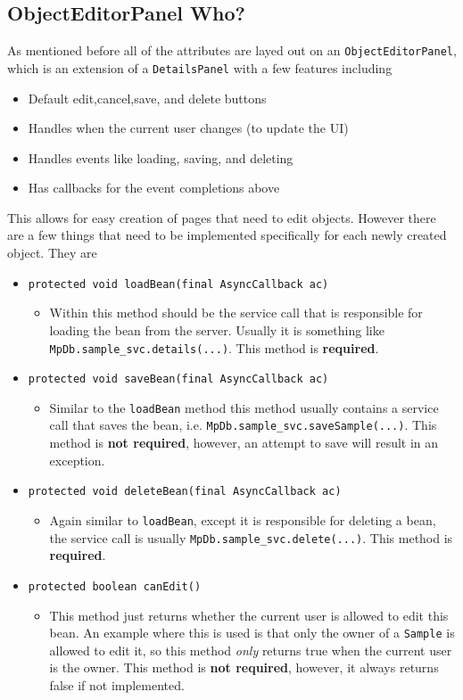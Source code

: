 \documentclass[10pt,letterpaper,onecolumn,oneside]{report}
\begin{document}
\subsection{ObjectEditorPanel Who?}
As mentioned before all of the attributes are layed out on an \texttt{ObjectEditorPanel},
which is an extension of a \texttt{DetailsPanel} with a few features including
\begin{itemize}
\item Default edit,cancel,save, and delete buttons
\item Handles when the current user changes (to update the UI)
\item Handles events like loading, saving, and deleting
\item Has callbacks for the event completions above
\end{itemize}
This allows for easy creation of pages that need to edit objects.  However there are a few
things that need to be implemented specifically for each newly created object.  They are
\begin{itemize}
\item \texttt{protected void loadBean(final AsyncCallback ac)}
\begin{itemize}
\item Within this method should be the service call that is responsible for
loading the bean from the server.  Usually it is something like
\texttt{MpDb.sample\_svc.details(...)}.  This method is \textbf{required}.
\end{itemize}
\item \texttt{protected void saveBean(final AsyncCallback ac)}
\begin{itemize}
\item Similar to the \texttt{loadBean} method this method usually contains a service call
that saves the bean, i.e. \texttt{MpDb.sample\_svc.saveSample(...)}.  This method is 
\textbf{not required}, however, an attempt to save will result in an exception.
\end{itemize}
\item \texttt{protected void deleteBean(final AsyncCallback ac)}
\begin{itemize}
\item Again similar to \texttt{loadBean}, except it is responsible for deleting a bean, the
service call is usually \texttt{MpDb.sample\_svc.delete(...)}.  This method is \textbf{required}.
\end{itemize}
\item \texttt{protected boolean canEdit()}
\begin{itemize}
\item This method just returns whether the current user is allowed to edit this bean.
An example where this is used is that only the owner of a \texttt{Sample} is allowed to 
edit it, so this method \textit{only} returns true when the current user is the owner.
This method is \textbf{not required}, however, it always returns false if not implemented.
\end{itemize}
\end{itemize}
\end{document}
